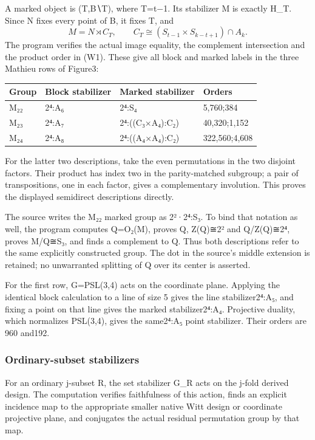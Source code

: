 A marked object is (T,B∖T), where \textbar T\textbar=t−1. Its stabilizer
M is exactly H\_T. Since N fixes every point of B, it fixes T, and \[
M=N\rtimes C_T,\qquad
C_T\cong (S_{t-1}\times S_{k-t+1})\cap A_k.
\tag{W1}
\] The program verifies the actual image equality, the complement
intersection and the product order in (W1). These give all block and
marked labels in the three Mathieu rows of Figure3:

{\def\LTcaptype{none} %
\begin{longtable}[]{@{}llll@{}}
\toprule\noalign{}
Group & Block stabilizer & Marked stabilizer & Orders \\
\midrule\noalign{}
\endhead
\bottomrule\noalign{}
\endlastfoot
M₂₂ & 2⁴:A₆ & 2⁴:S₄ & 5,760;384 \\
M₂₃ & 2⁴:A₇ & 2⁴:((C₃×A₄):C₂) & 40,320;1,152 \\
M₂₄ & 2⁴:A₈ & 2⁴:((A₄×A₄):C₂) & 322,560;4,608 \\
\end{longtable}
}

For the latter two descriptions, take the even permutations in the two
disjoint factors. Their product has index two in the parity-matched
subgroup; a pair of transpositions, one in each factor, gives a
complementary involution. This proves the displayed semidirect
descriptions directly.

The source writes the M₂₂ marked group as 2²·2⁴:S₃. To bind that
notation as well, the program computes Q=O₂(M), proves
\textbar Q, Z(Q)≅2² and Q/Z(Q)≅2⁴, proves M/Q≅S₃, and finds a
complement to Q. Thus both descriptions refer to the same explicitly
constructed group. The dot in the source's middle extension is retained;
no unwarranted splitting of Q over its center is asserted.

For the first row, G=PSL(3,4) acts on the coordinate plane. Applying the
identical block calculation to a line of size 5 gives the line
stabilizer2⁴:A₅, and fixing a point on that line gives the marked
stabilizer2⁴:A₄. Projective duality, which normalizes PSL(3,4), gives
the same2⁴:A₅ point stabilizer. Their orders are 960 and192.

\subsubsection{Ordinary-subset
stabilizers}\label{ordinary-subset-stabilizers}

For an ordinary j-subset R, the set stabilizer G\_R acts on the j-fold
derived design. The computation verifies faithfulness of this action,
finds an explicit incidence map to the appropriate smaller native Witt
design or coordinate projective plane, and conjugates the actual
residual permutation group by that map.


